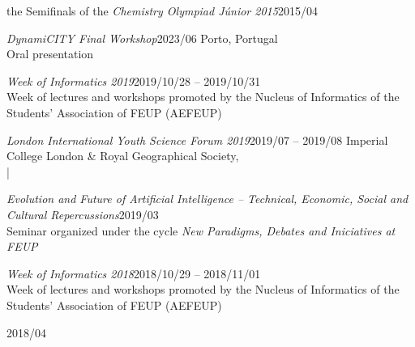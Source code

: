 \documentclass{cv}
\newif\ifen
\newif\ifpt
\newcommand{\en}[1]{\ifen#1\fi}
\newcommand{\pt}[1]{\ifpt#1\fi}
\begin{document}
\begin{jobopt}{\en{Participation in} the Semifinals of the \textit{Chemistry Olympiad Júnior 2015}}{2015/04}
\begin{job}{\textit{DynamiCITY Final Workshop}}{2023/06}%
    Porto, Portugal\\
    Oral presentation
\end{job}
\begin{jobopt}{\textit{Week of Informatics 2019}}{2019/10/28 -- 2019/10/31}
    \en{Faculty of Engineering of the University of Porto}\\
    Week of lectures and workshops promoted by the Nucleus of Informatics of the Students' Association of FEUP (AEFEUP)
\end{jobopt}
\begin{job}{\textit{London International Youth Science Forum 2019}}{2019/07 -- 2019/08}%
    Imperial College London \& Royal Geographical Society, \en{London}\\
    \en{Poster presentation} | \en{Supported by the Calouste Gulbenkian Foundation}
\end{job}
\begin{jobopt}{\textit{Evolution and Future of Artificial Intelligence -- Technical, Economic, Social and Cultural Repercussions}}{2019/03}%
    \en{Faculty of Engineering of the University of Porto}\\
    Seminar organized under the cycle \textit{New Paradigms, Debates and Iniciatives at FEUP}
\end{jobopt}
\begin{jobopt}{\textit{Week of Informatics 2018}}{2018/10/29 -- 2018/11/01}
    \en{Faculty of Engineering of the University of Porto}\\
    Week of lectures and workshops promoted by the Nucleus of Informatics of the Students' Association of FEUP (AEFEUP)
\end{jobopt}
\begin{jobopt}{\en{Youth Municipal Assembly of Maia}}{2018/04}%
    \en{Municipal Chamber of Maia}
    \\ \en{Took place as part of the Commemorations of the 44th anniversary of the Carnation Revolution}
    \\ \en{Deputee of the Youth Municipal Assembly, representing Castêlo da Maia Schools Grouping}

\end{jobopt}
\end{jobopt}
\end{document}
